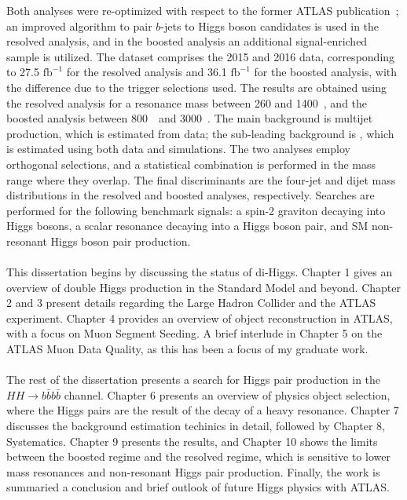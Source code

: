 Both analyses were re-optimized with respect to the former ATLAS publication~\cite{EXOT-2015-11}; an improved algorithm to pair $b$-jets to Higgs boson candidates is used in the resolved analysis, and in the boosted analysis an additional signal-enriched sample is utilized. The dataset comprises the 2015 and 2016 data, corresponding to 27.5 $\mathrm{fb}^{-1}$ for the resolved analysis and 36.1 $\mathrm{fb}^{-1}$ for the boosted analysis, with the difference due to the trigger selections used. The results are obtained using the resolved analysis for a resonance mass between 260 and 1400~\GeV, and the boosted analysis between 800~\GeV\ and 3000~\GeV. The main background is multijet production, which is estimated from data; the sub-leading background is \ttbar, which is estimated using both data and simulations. The two analyses employ orthogonal selections, and a statistical combination is performed in the mass range where they overlap. The final discriminants are the four-jet and dijet mass distributions in the resolved and boosted analyses, respectively. Searches are performed for the following benchmark signals: a spin-2 graviton decaying into Higgs bosons, a scalar resonance decaying into a Higgs boson pair, and SM non-resonant Higgs boson pair production.



\paragraph{}
This dissertation begins by discussing the status of di-Higgs.  Chapter 1 gives an overview of double Higgs production in the Standard Model and beyond. Chapter 2 and 3 present details regarding the Large Hadron Collider and the ATLAS experiment. Chapter 4 provides an overview of object reconstruction in ATLAS, with a focus on Muon Segment Seeding. A brief interlude in Chapter 5 on the ATLAS Muon Data Quality, as this has been a focus of my graduate work. 

\paragraph{}
The rest of the dissertation presents a search for Higgs pair production in the $HH \to b\bar{b} b\bar{b}$ channel. Chapter 6 presents an overview of physics object selection, where the Higgs pairs are the result of the decay of a heavy resonance. Chapter 7 discusses the background estimation techinics in detail, followed by Chapter 8, Systematics. Chapter 9 presents the results, and Chapter 10 shows the limits between the boosted regime and the resolved regime, which is sensitive to lower mass resonances and non-resonant Higgs pair production. Finally, the work is summaried a conclusion and brief outlook of future Higgs physics with ATLAS.
